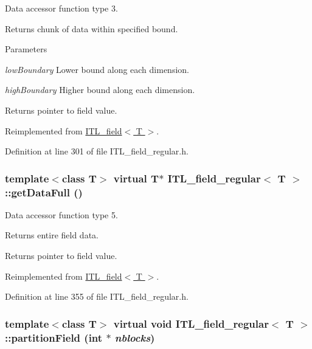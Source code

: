 Data accessor function type 3. 

Returns chunk of data within specified bound. 
\begin{DoxyParams}{Parameters}
\item[{\em lowBoundary}]Lower bound along each dimension. \item[{\em highBoundary}]Higher bound along each dimension. \end{DoxyParams}
\begin{DoxyReturn}{Returns}
pointer to field value. 
\end{DoxyReturn}


Reimplemented from \hyperlink{classITL__field_a983bd8b95e95bf758a73fafccea62a49}{ITL\_\-field$<$ T $>$}.



Definition at line 301 of file ITL\_\-field\_\-regular.h.

\hypertarget{classITL__field__regular_ac1e68a90b1eb23279aa18e5827102b2e}{
\subsubsection[{getDataFull}]{\setlength{\rightskip}{0pt plus 5cm}template$<$class T$>$ virtual T$\ast$ {\bf ITL\_\-field\_\-regular}$<$ T $>$::getDataFull ()}}
\label{classITL__field__regular_ac1e68a90b1eb23279aa18e5827102b2e}


Data accessor function type 5. 

Returns entire field data. \begin{DoxyReturn}{Returns}
pointer to field value. 
\end{DoxyReturn}


Reimplemented from \hyperlink{classITL__field_afba4c040443d3f21d3f4af30a70292be}{ITL\_\-field$<$ T $>$}.



Definition at line 355 of file ITL\_\-field\_\-regular.h.

\hypertarget{classITL__field__regular_a0497909739ef494ee78808bbbfeaba0f}{
\subsubsection[{partitionField}]{\setlength{\rightskip}{0pt plus 5cm}template$<$class T$>$ virtual void {\bf ITL\_\-field\_\-regular}$<$ T $>$::partitionField (int $\ast$ {\em nblocks})}}
\label{classITL__field__regular_a0497909739ef494ee78808bbbfeaba0f}


